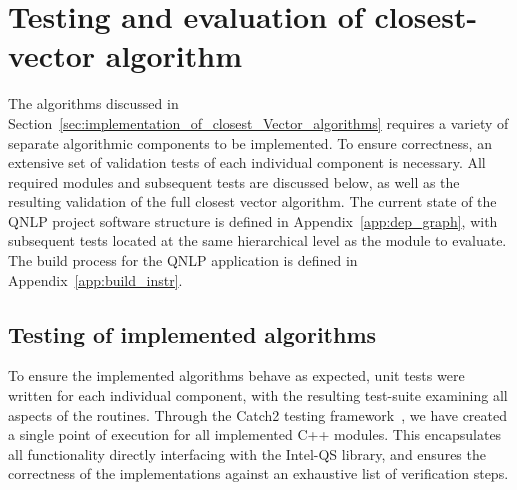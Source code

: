\section{Testing and evaluation of closest-vector algorithm}
\label{sec:testing_and_evaluation_of_disco_algorithms}

The algorithms discussed in Section~\ref{sec:implementation_of_closest_Vector_algorithms} requires a variety of separate algorithmic components to be implemented. To ensure correctness, an extensive set of validation tests of each individual component is necessary. All required modules and subsequent tests are discussed below, as well as the resulting validation of the full closest vector algorithm. The current state of the QNLP project software structure is defined in Appendix~\ref{app:dep_graph}, with subsequent tests located at the same hierarchical level as the module to evaluate. The build process for the QNLP application is defined in Appendix~\ref{app:build_instr}.

\subsection{Testing of implemented algorithms}
\label{sec:testing_of_implemented_algorithms}

To ensure the implemented algorithms behave as expected, unit tests were written for each individual component, with the resulting test-suite examining all aspects of the routines. Through the Catch2 testing framework~\cite{catch2}, we have created a single point of execution for all implemented C++ modules. This encapsulates all functionality directly interfacing with the Intel\textregistered-QS library, and ensures the correctness of the implementations against an exhaustive list of verification steps.

